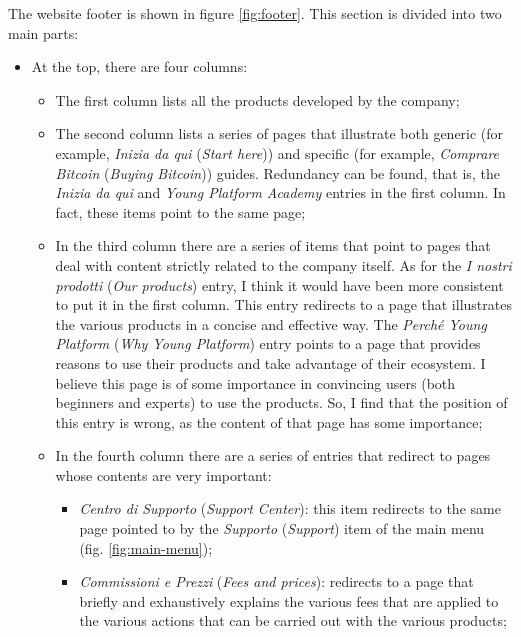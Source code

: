 The website footer is shown in figure \ref{fig:footer}. This section is 
divided into two main parts:
\begin{itemize}
  \item At the top, there are four columns:
  \begin{itemize}
    \item The first column lists all the products developed by the company;

    \item The second column lists a series of pages that illustrate both 
    generic (for example, \textit{Inizia da qui} (\textit{Start here})) and 
    specific (for example, \textit{Comprare Bitcoin} 
    (\textit{Buying Bitcoin})) guides. Redundancy can be found, that is, 
    the \textit{Inizia da qui} and \textit{Young Platform Academy} entries 
    in the first column. In fact, these items point to the same page;

    \item In the third column there are a series of items that point to 
    pages that deal with content strictly related to the company itself. 
    As for the \textit{I nostri prodotti} (\textit{Our products}) entry, 
    I think it would have been more consistent to put it in the first 
    column. This entry redirects to a page that illustrates the various 
    products in a concise and effective way. The 
    \textit{Perché Young Platform} (\textit{Why Young Platform}) entry 
    points to a page that provides reasons to use their products and take 
    advantage of their ecosystem. I believe this page is of some importance 
    in convincing users (both beginners and experts) to use the products. 
    So, I find that the position of this entry is wrong, as the content of 
    that page has some importance;

    \item In the fourth column there are a series of entries that redirect 
    to pages whose contents are very important:
    \begin{itemize}
      \item \textit{Centro di Supporto} (\textit{Support Center}): this item 
      redirects to the same page pointed to by the \textit{Supporto} 
      (\textit{Support}) item of the main menu (fig. \ref{fig:main-menu});

      \item \textit{Commissioni e Prezzi} (\textit{Fees and prices}): 
      redirects to a page that briefly and exhaustively explains the various 
      fees that are applied to the various actions that can be carried out 
      with the various products;


\end{itemize}
\end{itemize}
\end{itemize}
